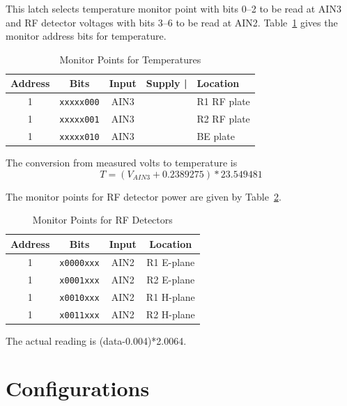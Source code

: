 \documentclass[letterpaper,11pt]{book}
\begin{document}
This latch selects temperature monitor point with bits 0--2 to be read at AIN3
and RF detector voltages with bits 3--6 to be read at AIN2.
Table~\ref{tab:T-mon-points} gives the monitor address bits for temperature.
\begin{table}[h!tb]
  \begin{center}
    \caption{\label{tab:T-mon-points}Monitor Points for Temperatures}
    \small \begin{tabular}{|c|c|c|rl|}
\hline  
{\bf Address} & {\bf Bits} & {\bf Input} & {\bf Supply |} & {\bf Location}  \\
\hline
1 & {\tt xxxxx000} & AIN3 & & R1 RF plate  \\
1 & {\tt xxxxx001} & AIN3 & & R2 RF plate  \\
1 & {\tt xxxxx010} & AIN3 & & BE plate     \\
 \hline
    \end{tabular}
  \end{center}
\end{table}
The conversion from measured volts to temperature is
\begin{displaymath}
  T = (V_{AIN3}+0.2389275)*23.549481
\end{displaymath}

The monitor points for RF detector power are given by 
Table~\ref{tab:RF-mon-points}.
\begin{table}[h!tb]
  \begin{center}
    \caption{\label{tab:RF-mon-points}Monitor Points for RF Detectors}
    \small \begin{tabular}{|c|c|c|c|}
     \hline
{\bf Address} & {\bf Bits}     & {\bf Input} & {\bf Location}  \\
\hline
1             & {\tt x0000xxx} & AIN2        & R1 E-plane  \\
1             & {\tt x0001xxx} & AIN2        & R2 E-plane  \\
1             & {\tt x0010xxx} & AIN2        & R1 H-plane \\
1             & {\tt x0011xxx} & AIN2        & R2 H-plane  \\
 \hline
    \end{tabular}
  \end{center}
\end{table}
The actual reading is (data-0.004)*2.0064.

\chapter{Configurations}\label{chap:config}
\end{document}

